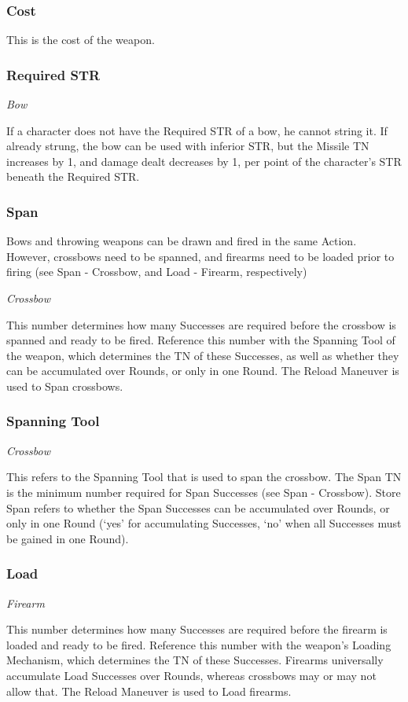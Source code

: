 \documentclass[oneside,11pt,english]{book}
\begin{document}
\subsubsection{Cost}
This is the cost of the weapon.

\subsubsection{Required STR}
\vspace{-10pt}\emph{Bow}

If a character does not have the Required STR of a bow, he cannot string it. If already strung, the bow can 
be used with inferior STR, but the Missile TN increases by 1, and damage dealt decreases by 1, per point 
of the character’s STR beneath the Required STR. 

\subsubsection{Span}
Bows and throwing weapons can be drawn and fired in the same Action. However, crossbows need to be 
spanned, and firearms need to be loaded prior to firing (see Span - Crossbow, and Load - Firearm, 
respectively)

\vspace{-10pt}\emph{Crossbow}

This number determines how many Successes are required before the crossbow is spanned and ready to 
be fired. Reference this number with the Spanning Tool of the weapon, which determines the TN of these 
Successes, as well as whether they can be accumulated over Rounds, or only in one Round. The Reload 
Maneuver is used to Span crossbows. 

\subsubsection{Spanning Tool}
\vspace{-10pt}\emph{Crossbow}

This refers to the Spanning Tool that is used to span the crossbow. The Span TN is the minimum number 
required for Span Successes (see Span - Crossbow). Store Span refers to whether the Span Successes can 
be accumulated over Rounds, or only in one Round (‘yes’ for accumulating Successes, ‘no’ when all 
Successes must be gained in one Round). 

\subsubsection{Load}
\vspace{-10pt}\emph{Firearm}\par
This number determines how many Successes are required before the firearm is loaded and ready to be 
fired. Reference this number with the weapon’s Loading Mechanism, which determines the TN of these 
Successes. Firearms universally accumulate Load Successes over Rounds, whereas crossbows may or 
may not allow that. The Reload Maneuver is used to Load firearms. 
\end{document}
